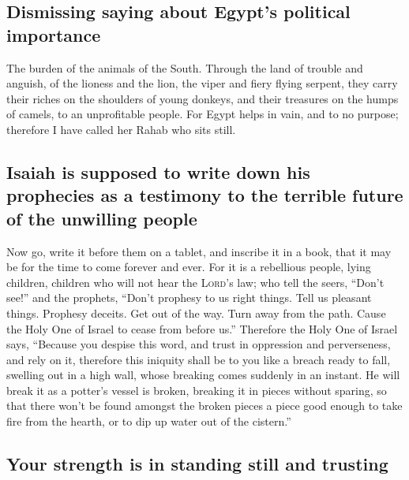\hypertarget{dismissing-saying-about-egypts-political-importance}{%
\subsection{Dismissing saying about Egypt's political
importance}\label{dismissing-saying-about-egypts-political-importance}}

 The burden of the animals of the South. Through the land
of trouble and anguish, of the lioness and the lion, the viper and fiery
flying serpent, they carry their riches on the shoulders of young
donkeys, and their treasures on the humps of camels, to an unprofitable
people.  For Egypt helps in vain, and to no purpose;
therefore I have called her Rahab who sits still.

\hypertarget{isaiah-is-supposed-to-write-down-his-prophecies-as-a-testimony-to-the-terrible-future-of-the-unwilling-people}{%
\subsection{Isaiah is supposed to write down his prophecies as a
testimony to the terrible future of the unwilling
people}\label{isaiah-is-supposed-to-write-down-his-prophecies-as-a-testimony-to-the-terrible-future-of-the-unwilling-people}}

 Now go, write it before them on a tablet, and inscribe it
in a book, that it may be for the time to come forever and ever.
 For it is a rebellious people, lying children, children
who will not hear the \textsc{Lord}'s law;  who tell the
seers, ``Don't see!'' and the prophets, ``Don't prophesy to us right
things. Tell us pleasant things. Prophesy deceits.  Get
out of the way. Turn away from the path. Cause the Holy One of Israel to
cease from before us.''  Therefore the Holy One of Israel
says, ``Because you despise this word, and trust in oppression and
perverseness, and rely on it,  therefore this iniquity
shall be to you like a breach ready to fall, swelling out in a high
wall, whose breaking comes suddenly in an instant.  He
will break it as a potter's vessel is broken, breaking it in pieces
without sparing, so that there won't be found amongst the broken pieces
a piece good enough to take fire from the hearth, or to dip up water out
of the cistern.''

\hypertarget{your-strength-is-in-standing-still-and-trusting}{%
\subsection{Your strength is in standing still and
trusting}\label{your-strength-is-in-standing-still-and-trusting}}

